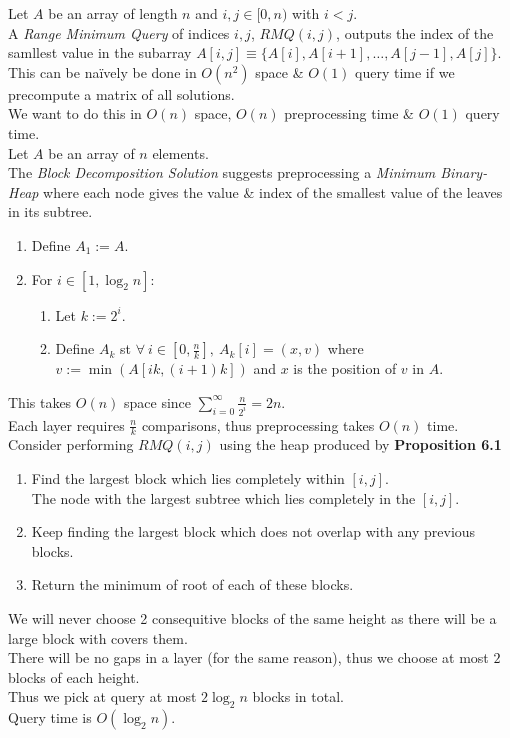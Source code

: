 \documentclass[11pt,a4paper]{article}
\begin{document}
Let $A$ be an array of length $n$ and $i,j\in[0,n)$ with $i<j$.\\
A \textit{Range Minimum Query} of indices $i,j$, $RMQ(i,j)$, outputs the index of the samllest value in the subarray $A[i,j]\equiv\big\{A[i],A[i+1],\dots,A[j-1],A[j]\big\}$.\\

This can be na\"ively be done in $O(n^2)$ space \& $O(1)$ query time if we precompute a matrix of all solutions.\\
We want to do this in $O(n)$ space, $O(n)$ preprocessing time \& $O(1)$ query time.\\

Let $A$ be an array of $n$ elements.\\
The \textit{Block Decomposition Solution} suggests preprocessing a \textit{Minimum Binary-Heap} where each node gives the value \& index of the smallest value of the leaves in its subtree.
\begin{enumerate}
	\item Define $A_1:=A$.
	\item For $i\in[1,\log_2n]$:
	\begin{enumerate}
		\item Let $k:=2^i$.
		\item Define $A_k$ st $\forall\ i\in[0,\frac{n}k],\ A_k[i]=(x,v)$ where $v:=\min(A[ik,(i+1)k])$ and $x$ is the position of $v$ in $A$.
	\end{enumerate}
\end{enumerate}
This takes $O(n)$ space since $\sum_{i=0}^\infty\frac{n}{2^i}=2n$.\\
Each layer requires $\frac{n}k$ comparisons, thus preprocessing takes $O(n)$ time.\\

Consider performing $RMQ(i,j)$ using the heap produced by \textbf{Proposition 6.1}
\begin{enumerate}
	\item Find the largest block which lies completely within $[i,j]$.\\
	\ie The node with the largest subtree which lies completely in the $[i,j]$.
	\item Keep finding the largest block which does not overlap with any previous blocks.\\
	\item Return the minimum of root of each of these blocks.
\end{enumerate}
We will never choose 2 consequitive blocks of the same height as there will be a large block with covers them.\\
There will be no gaps in a layer (for the same reason), thus we choose at most $2$ blocks of each height.\\
Thus we pick at query at most $2\log_2n$ blocks in total.\\
Query time is $O(\log_2n)$.\\
\end{document}
